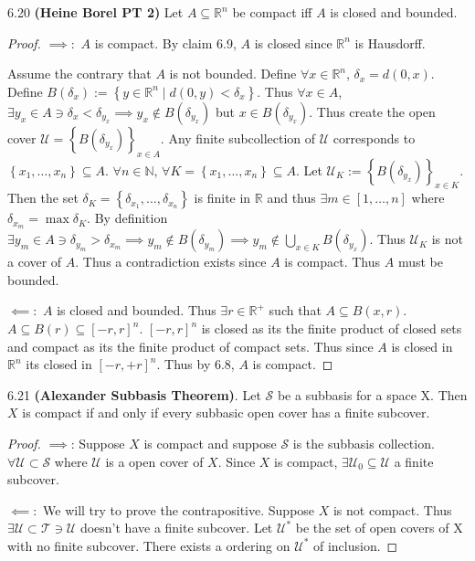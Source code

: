 \documentclass{article}
\newcommand*{\T}{\mathcal{T}}
\newcommand*{\U}{\mathcal{U}}
\newcommand*{\subeq}{\subseteq}
\newcommand{\R}{\mathbb{R}}
\newcommand{\N}{\mathbb{N}}
\begin{document}
\begin{PROB}{6.20}\label{Problem 6.20.}
    \textbf{(Heine Borel PT 2)} Let $A \subseteq \R^n$ be compact iff $A$ is closed and bounded.   
\end{PROB}
\begin{proof}
    $\implies:$ $A$ is compact. By claim 6.9, $A$ is closed since $\R^n$ is Hausdorff. 
    
    Assume the contrary that $A$ is not bounded. Define $\forall x \in \R^n$, $\delta_x = d(0, x)$. Define $B(\delta_x) := \left\{ y \in \R^n \mid d(0, y) < \delta_x \right\}$. Thus $\forall x \in A$, $\exists y_x \in A \ni \delta_x < \delta_{y_x} \implies y_x \not \in B(\delta_{y_x})$ but $x \in B(\delta_{y_x})$. Thus create the open cover $\mathcal{U} = \left\{ B(\delta_{y_x}) \right\}_{x \in A}$. Any finite subcollection of $\mathcal{U}$ corresponds to $\left\{ x_1, \dots, x_n \right\} \subseteq A$. $\forall n \in \N$, $\forall K = \left\{ x_1, \dots, x_n \right\} \subeq A$. Let $\mathcal{U}_K := \left\{ B(\delta_{y_{x}}) \right\}_{x \in K}$. Then the set $\delta_K = \left\{ \delta_{x_1}, \dots, \delta_{x_n}\right\}$ is finite in $\R$ and thus $\exists m \in [1, \dots, n]$ where $\delta_{x_m} = \max \delta_{K}$. By definition $\exists y_m \in A \ni \delta_{y_m} > \delta_{x_m} \implies y_{m} \not \in B(\delta_{y_m}) \implies y_m \not \in \bigcup_{x \in K} B(\delta_{y_x})$. Thus $\mathcal{U}_K$ is not a cover of $A$. Thus a contradiction exists since $A$ is compact. Thus $A$ must be bounded.               
    
    $\impliedby:$ $A$ is closed and bounded. Thus $\exists r \in \R^+$ such that $A \subseteq B(x, r)$. $A \subseteq B(r) \subseteq [-r, r]^n$. $[-r, r]^n$ is closed as its the finite product of closed sets and compact as its the finite product of compact sets. Thus since $A$ is closed in $\R^n$ its closed in $[-r, +r]^n$. Thus by 6.8, $A$ is compact.
\end{proof}

\bigskip

\begin{claim}{6.21}\label{Claim 6.21.}
    \textbf{(Alexander Subbasis Theorem)}. Let $\mathcal{S}$ be a subbasis for a space X. Then $X$ is compact if and only if every subbasic open cover has a finite subcover.  
\end{claim}
\begin{proof}
    $\implies$: Suppose $X$ is compact and suppose $\mathcal{S}$ is the subbasis collection. $\forall \mathcal{U} \subset \mathcal{S}$ where $\mathcal{U}$ is a open cover of $X$. Since $X$ is compact, $\exists \mathcal{U}_0 \subseteq \mathcal{U}$ a finite subcover. 
    
    $\impliedby:$ We will try to prove the contrapositive. Suppose $X$ is not compact. Thus $\exists \U \subset \T \ni \U$ doesn't have a finite subcover. Let $\U^*$ be the set of open covers of X with no finite subcover. There exists a ordering on $\U^*$ of inclusion.      
\end{proof}
\end{document}
